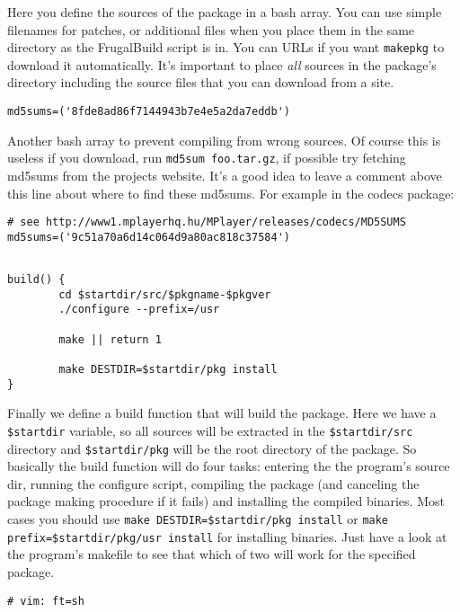 Here you define the sources of the package in a bash array. You can use simple filenames for patches, or additional files when you place them in the same directory as the FrugalBuild script is in. You can URLs if you want {\tt makepkg} to download it automatically. It's important to place \textit{all} sources in the package's directory including the source files that you can download from a site.

\begin{verbatim}
md5sums=('8fde8ad86f7144943b7e4e5a2da7eddb')
\end{verbatim}

Another bash array to prevent compiling from wrong sources. Of course this is useless if you download, run {\tt md5sum foo.tar.gz}, if possible try fetching md5sums from the projects website. It's a good idea to leave a comment above this line about where to find these md5sums. For example in the codecs package:

\begin{verbatim}
# see http://www1.mplayerhq.hu/MPlayer/releases/codecs/MD5SUMS
md5sums=('9c51a70a6d14c064d9a80ac818c37584')
\end{verbatim}

\begin{verbatim}

build() {
        cd $startdir/src/$pkgname-$pkgver
        ./configure --prefix=/usr
	
        make || return 1
	
        make DESTDIR=$startdir/pkg install
}
\end{verbatim}

Finally we define a build function that will build the package. Here we have a {\tt \$startdir} variable, so all sources will be extracted in the {\tt \$startdir/src} directory and {\tt \$startdir/pkg} will be the root directory of the package. So basically the build function will do four tasks: entering the the program's source dir, running the configure script, compiling the package (and canceling the package making procedure if it fails) and installing the compiled binaries. Most cases you should use {\tt make DESTDIR=\$startdir/pkg install} or {\tt make prefix=\$startdir/pkg/usr install} for installing binaries. Just have a look at the program's makefile to see that which of two will work for the specified package.

\begin{verbatim}
# vim: ft=sh
\end{verbatim}

